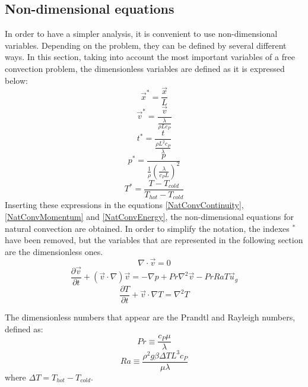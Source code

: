 \subsection{Non-dimensional equations}
In order to have a simpler analysis, it is convenient to use non-dimensional variables. Depending on the problem, they can be defined by several different ways. In this section, taking into account the most important variables of a free convection problem, the dimensionless variables are defined as it is expressed below:
\begin{equation}
\vec{x}^{*}=\frac{\vec{x}}{L}
\end{equation}
\begin{equation}
\vec{v}^{*}=\frac{\vec{v}}{\frac{\lambda}{\rho Lc_{P}}}
\end{equation}
\begin{equation}
t^{*}=\frac{t}{\frac{\rho L^{2}c_{P}}{\lambda}}
\end{equation}
\begin{equation}
p^{*}=\frac{p}{\frac{1}{\rho}\left(\frac{\lambda}{c_{P}L}\right)^2}
\end{equation}
\begin{equation}
T^{*}=\frac{T-T_{cold}}{T_{hot}-T_{cold}}
\end{equation}
Inserting these expressions in the equations \ref{NatConvContinuity}, \ref{NatConvMomentum} and \ref{NatConvEnergy}, the non-dimensional equations for natural convection are obtained. In order to simplify the notation, the indexes $^{*}$ have been removed, but the variables that are represented in the following section are the dimensionless ones.
\begin{equation}
\nabla\cdot\vec{v}=0
\end{equation}
\begin{equation}
\frac{\partial\vec{v}}{\partial t}+\left(\vec{v}\cdot\nabla\right)\vec{v}=-\nabla p+Pr\nabla^{2}\vec{v}-PrRaT\vec{u}_{g}
\end{equation}
\begin{equation}
\frac{\partial T}{\partial t}+\vec{v}\cdot\nabla T=\nabla^{2}T
\end{equation}

The dimensionless numbers that appear are the Prandtl and Rayleigh numbers, defined as:
\begin{equation}
Pr\equiv\frac{c_{P}\mu}{\lambda}
\end{equation}
\begin{equation}
Ra\equiv\frac{\rho^{2} g\beta\Delta TL^{3}c_{P}}{\mu\lambda}
\end{equation}
where $\Delta T=T_{hot}-T_{cold}$.

